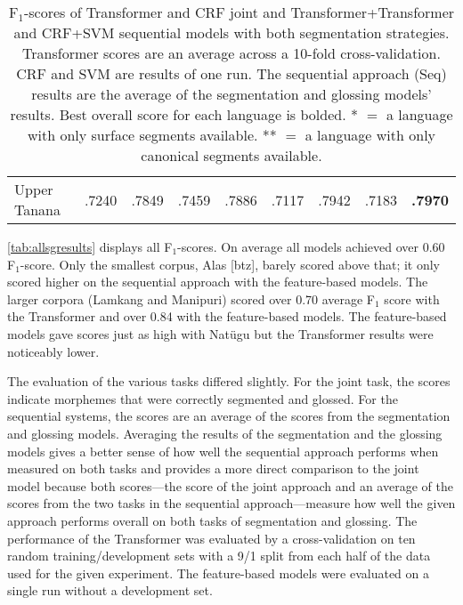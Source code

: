 \begin{table}[!tb]
\begin{tabular}{l|cc|cc|cc|cc}
         \hline
         Upper Tanana & .7240 & .7849 & .7459 & .7886
                      & .7117 & .7942 & .7183 & \textbf{.7970} \\
    \end{tabular}
    \caption[Results of All Segmentation and Glossing Models]{F$_1$-scores of Transformer and CRF joint and Transformer+Transformer and CRF+SVM sequential models with both segmentation strategies. Transformer scores are an average across a 10-fold cross-validation. CRF and SVM are results of one run. The sequential approach (Seq) results are the average of the segmentation and glossing models' results. Best overall score for each language is bolded. * $=$ a language with only surface segments available. ** $=$ a language with only canonical segments available.}
    \label{tab:allsgresults}
\end{table}


\autoref{tab:allsgresults} displays all F$_1$-scores. On average all models achieved over 0.60 F$_1$-score. Only the smallest corpus, Alas [btz], barely scored above that; it only scored higher on the sequential approach with the feature-based models. The larger corpora (Lamkang and Manipuri) scored over 0.70 average F$_1$ score with the Transformer and over 0.84 with the feature-based models. The feature-based models gave scores just as high with Nat\"ugu but the Transformer results were noticeably lower.

The evaluation of the various tasks differed slightly. For the joint task, the scores indicate morphemes that were correctly segmented and glossed. For the sequential systems, the scores are an average of the scores from the segmentation and glossing models. Averaging the results of the segmentation and the glossing models gives a better sense of how well the sequential approach performs when measured on both tasks and provides a more direct comparison to the joint model because both scores---the score of the joint approach and an average of the scores from the two tasks in the sequential approach---measure how well the given approach performs overall on both tasks of segmentation and glossing. The performance of the Transformer was evaluated by a cross-validation on ten random training/development sets with a 9/1 split from each half of the data used for the given experiment. The feature-based models were evaluated on a single run without a development set. 


